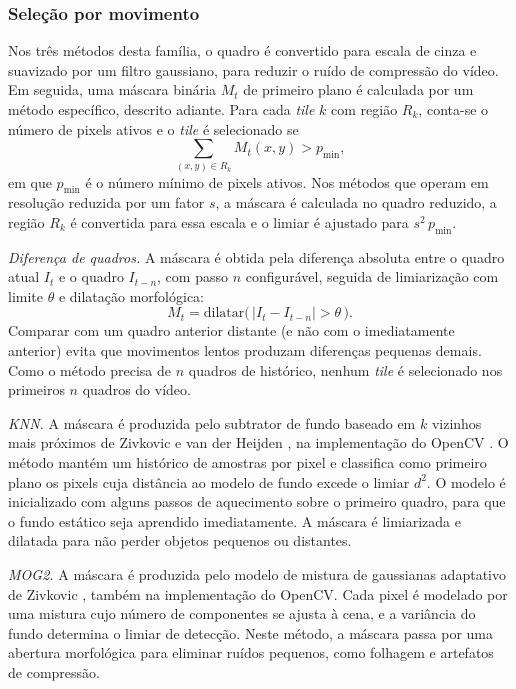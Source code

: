 \documentclass{ieeeaccess}
\begin{document}
\subsubsection{Seleção por movimento}
Nos três métodos desta família, o quadro é convertido para escala de cinza e suavizado por um filtro gaussiano, para reduzir o ruído de compressão do vídeo. Em seguida, uma máscara binária $M_t$ de primeiro plano é calculada por um método específico, descrito adiante. Para cada \textit{tile} $k$ com região $R_k$, conta-se o número de pixels ativos e o \textit{tile} é selecionado se
\begin{equation}
\sum_{(x,y) \in R_k} M_t(x,y) > p_{\min},
\label{eq:limiar_pixels}
\end{equation}
em que $p_{\min}$ é o número mínimo de pixels ativos. Nos métodos que operam em resolução reduzida por um fator $s$, a máscara é calculada no quadro reduzido, a região $R_k$ é convertida para essa escala e o limiar é ajustado para $s^2\,p_{\min}$.

\textit{Diferença de quadros.} A máscara é obtida pela diferença absoluta entre o quadro atual $I_t$ e o quadro $I_{t-n}$, com passo $n$ configurável, seguida de limiarização com limite $\theta$ e dilatação morfológica:
\begin{equation}
M_t = \mathrm{dilatar}\big(\,|I_t - I_{t-n}| > \theta\,\big).
\label{eq:framediff}
\end{equation}
Comparar com um quadro anterior distante (e não com o imediatamente anterior) evita que movimentos lentos produzam diferenças pequenas demais. Como o método precisa de $n$ quadros de histórico, nenhum \textit{tile} é selecionado nos primeiros $n$ quadros do vídeo.

\textit{KNN.} A máscara é produzida pelo subtrator de fundo baseado em $k$ vizinhos mais próximos de Zivkovic e van der Heijden \cite{zivkovic2006knn}, na implementação do OpenCV \cite{opencv}. O método mantém um histórico de amostras por pixel e classifica como primeiro plano os pixels cuja distância ao modelo de fundo excede o limiar $d^2$. O modelo é inicializado com alguns passos de aquecimento sobre o primeiro quadro, para que o fundo estático seja aprendido imediatamente. A máscara é limiarizada e dilatada para não perder objetos pequenos ou distantes.

\textit{MOG2.} A máscara é produzida pelo modelo de mistura de gaussianas adaptativo de Zivkovic \cite{zivkovic2004mog2}, também na implementação do OpenCV. Cada pixel é modelado por uma mistura cujo número de componentes se ajusta à cena, e a variância do fundo determina o limiar de detecção. Neste método, a máscara passa por uma abertura morfológica para eliminar ruídos pequenos, como folhagem e artefatos de compressão.
\end{document}
